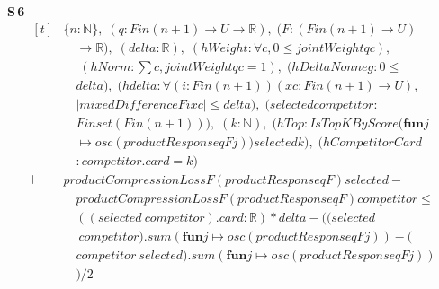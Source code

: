 \noindent\textbf{S\,6}\quad{}
{\footnotesize\[ \begin{aligned}[t]
&\{ \mathit{n} : \mathbb{N} \},\; (\mathit{q} : \mathit{Fin} (\mathit{n} + 1) \to \mathit{U} \to \mathbb{R} ),\; (\mathit{F} : (\mathit{Fin} (\mathit{n} + 1) \to \mathit{U})\\
&\quad \to \mathbb{R} ),\; (\mathit{delta} : \mathbb{R} ),\; (\mathit{hWeight} : \forall \mathit{c}, 0 \leq \mathit{jointWeight} \mathit{q} \mathit{c}),\\
&\quad \; (\mathit{hNorm} : \textstyle\sum \mathit{c}, \mathit{jointWeight} \mathit{q} \mathit{c} = 1),\; (\mathit{hDeltaNonneg} : 0 \leq\\
&\quad \mathit{delta}),\; (\mathit{hdelta} : \forall (\mathit{i} : \mathit{Fin} (\mathit{n} + 1)) (\mathit{x} \mathit{c} : \mathit{Fin} (\mathit{n} + 1) \to \mathit{U}),\\
&\quad |\mathit{mixedDifference} \mathit{F} \mathit{i} \mathit{x} \mathit{c}| \leq \mathit{delta}),\; (\mathit{selected} \mathit{competitor} :\\
&\quad \mathit{Finset} (\mathit{Fin} (\mathit{n} + 1))),\; (\mathit{k} : \mathbb{N} ),\; (\mathit{hTop} : \mathit{IsTopKByScore} (\mathbf{fun} \mathit{j}\\
&\quad \mapsto \mathit{osc} (\mathit{productResponse} \mathit{q} \mathit{F} \mathit{j})) \mathit{selected} \mathit{k}),\; (\mathit{hCompetitorCard}\\
&\quad : \mathit{competitor}.\mathit{card} = \mathit{k})\\
\vdash\;&\mathit{productCompressionLoss} \mathit{F} (\mathit{productResponse} \mathit{q} \mathit{F}) \mathit{selected} -\\
&\quad \mathit{productCompressionLoss} \mathit{F} (\mathit{productResponse} \mathit{q} \mathit{F}) \mathit{competitor} \leq\\
&\quad ((\mathit{selected} \ \mathit{competitor}).\mathit{card} : \mathbb{R} ) * \mathit{delta} - ((\mathit{selected}\\
&\quad \ \mathit{competitor}).\mathit{sum} (\mathbf{fun} \mathit{j} \mapsto \mathit{osc} (\mathit{productResponse} \mathit{q} \mathit{F} \mathit{j})) - (\\
&\quad \mathit{competitor} \ \mathit{selected}).\mathit{sum} (\mathbf{fun} \mathit{j} \mapsto \mathit{osc} (\mathit{productResponse} \mathit{q} \mathit{F} \mathit{j}))\\
&\quad ) / 2
\end{aligned} \]}

